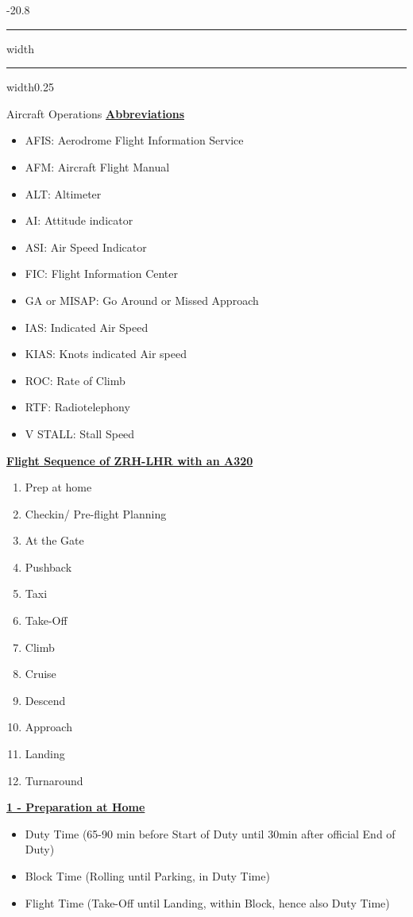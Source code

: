 \documentclass[9pt, landscape, fleqn]{scrartcl}
\makeatletter
\renewcommand{\section}{\@startsection{section}{1}{0mm}%
{-2\baselineskip}{0.8\baselineskip}%
{\hrule depth 0.2pt width\columnwidth\hrule depth1.5pt
width0.25\columnwidth\vspace*{1.2em}\Large\bfseries\rmfamily}}
\makeatother
\begin{document}
\begin{multicols*}{3}
\section{Aircraft Operations}
\underline{\textbf{Abbreviations}}
\begin{itemize}
    \item AFIS: Aerodrome Flight Information Service
    \item AFM: Aircraft Flight Manual
    \item ALT: Altimeter
    \item AI: Attitude indicator
    \item ASI: Air Speed Indicator 
    \item FIC: Flight Information Center 
    \item GA or MISAP: Go Around or Missed Approach
    \item IAS: Indicated Air Speed 
    \item KIAS: Knots indicated Air speed 
    \item ROC: Rate of Climb 
    \item RTF: Radiotelephony 
    \item V STALL: Stall Speed
\end{itemize}
\underline{\textbf{Flight Sequence of ZRH-LHR with an A320}}
\begin{enumerate}
    \item Prep at home 
    \item Checkin/ Pre-flight Planning 
    \item At the Gate 
    \item Pushback
    \item Taxi 
    \item Take-Off 
    \item Climb 
    \item Cruise 
    \item Descend 
    \item Approach 
    \item Landing 
    \item Turnaround
\end{enumerate}
\underline{\textbf{1 - Preparation at Home}}
\begin{itemize}
    \item Duty Time (65-90 min before Start of Duty until 30min after official End of Duty)
    \item Block Time (Rolling until Parking, in Duty Time)
    \item Flight Time (Take-Off until Landing, within Block, hence also Duty Time)

\end{itemize}
\end{multicols*}
\end{document}
